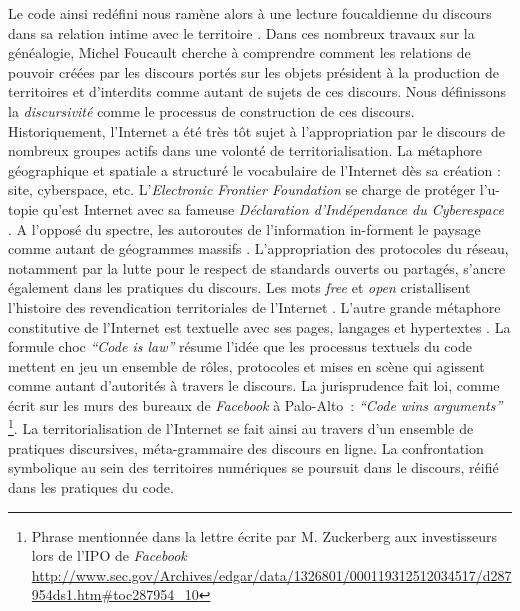 Le code ainsi redéfini nous ramène alors à une lecture foucaldienne du discours dans sa relation intime avec le territoire \citep{Foucault2004}. Dans ces nombreux travaux sur la généalogie, Michel Foucault cherche à comprendre comment les relations de pouvoir créées par les discours portés sur les objets président à la production de territoires et d’interdits comme autant de sujets de ces discours. Nous définissons la \textit{discursivité} comme le processus de construction de ces discours. Historiquement, l’Internet a été très tôt sujet à l’appropriation par le discours de nombreux groupes actifs dans une volonté de territorialisation. La métaphore géographique et spatiale a structuré le vocabulaire de l’Internet dès sa création \citep{Graham1998}: site, cyberspace, etc. L’\textit{Electronic Frontier Foundation} se charge de protéger l’u-topie qu’est Internet avec sa fameuse \textit{Déclaration d’Indépendance du Cyberespace} \citep{Barlow2001}. A l’opposé du spectre, les autoroutes de l’information in-forment le paysage comme autant de géogrammes massifs \citep{Berque1999}. L’appropriation des protocoles du réseau, notamment par la lutte pour le respect de standards ouverts ou partagés, s’ancre également dans les pratiques du discours. Les mots \textit{free} et \textit{open} cristallisent l’histoire des revendication territoriales de l’Internet \citep{Blondeau2000}. L’autre grande métaphore constitutive de l’Internet est textuelle avec ses pages, langages et hypertextes \citep{Vandendorpe1999}. La formule choc \textit{``Code is law''} \citep{Lessig2006} résume l’idée  que les processus textuels du code mettent en jeu un ensemble de rôles, protocoles et mises en scène qui agissent comme autant d’autorités à travers le discours. La jurisprudence fait loi, comme écrit sur les murs des bureaux de \textit{Facebook} à Palo-Alto : \textit{``Code wins arguments''} \footnote{Phrase mentionnée dans la lettre écrite par M. Zuckerberg aux investisseurs lors de l’IPO de \textit{Facebook} \url{http://www.sec.gov/Archives/edgar/data/1326801/000119312512034517/d287954ds1.htm\#toc287954_10}}. La territorialisation de l’Internet se fait ainsi au travers d’un ensemble de pratiques discursives, méta-grammaire des discours en ligne. La confrontation symbolique au sein des territoires numériques se poursuit dans le discours, réifié dans les pratiques du code.

